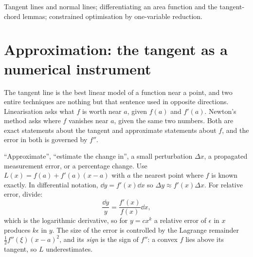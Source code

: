 \begin{seealsob}Tangent lines and normal lines; differentiating an area function and the tangent-chord lemmas; constrained optimisation by one-variable reduction.\end{seealsob}

\section{Approximation: the tangent as a numerical instrument}

The tangent line is the best linear model of a function near a point, and two entire techniques are nothing but that sentence used in opposite directions. Linearisation asks what $f$ is worth near $a$, given $f(a)$ and $f'(a)$. Newton's method asks where $f$ vanishes near $a$, given the same two numbers. Both are exact statements about the tangent and approximate statements about $f$, and the error in both is governed by $f''$.

\cue ``Approximate'', ``estimate the change in'', a small perturbation $\Delta x$, a propagated measurement error, or a percentage change.
\method Use $L(x)=f(a)+f'(a)(x-a)$ with $a$ the nearest point where $f$ is known exactly. In differential notation, $\dd y=f'(x)\dd x$ so $\Delta y\approx f'(x)\Delta x$. For relative error, divide:
\[
\frac{\dd y}{y}=\frac{f'(x)}{f(x)}\dd x ,
\]
which is the logarithmic derivative, so for $y=cx^{k}$ a relative error of $\epsilon$ in $x$ produces $k\epsilon$ in $y$. The size of the error is controlled by the Lagrange remainder $\tfrac12f''(\xi)(x-a)^{2}$, and its \emph{sign} is the sign of $f''$: a convex $f$ lies above its tangent, so $L$ underestimates.

